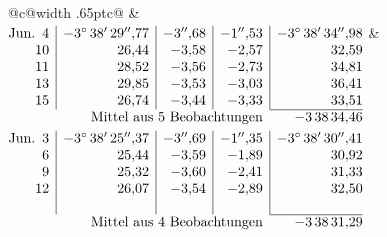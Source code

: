 \noindent\begin{tabular}{@{}c@{\hspace{.4em}\vrule width .65pt\hspace{.4em}}c@{}}
 &
 \\[.18ex]
\(\begin{array}[t]{@{}r|r|r|r|r@{}}
\text{Jun.}\enspace 4 & -3^\circ\,38'\,29''{,}77 & -3''{,}68 & -1''{,}53 & -3^\circ\,38'\,34''{,}98\\
10 & 26{,}44 & -3{,}58 & -2{,}57 & 32{,}59\\
11 & 28{,}52 & -3{,}56 & -2{,}73 & 34{,}81\\
13 & 29{,}85 & -3{,}53 & -3{,}03 & 36{,}41\\
15 & 26{,}74 & -3{,}44 & -3{,}33 & 33{,}51\\
\cline{5-5}
\multicolumn{4}{r}{\text{Mittel aus 5 Beobachtungen}} & -3\,38\,34{,}46
\end{array}\)
&
\(\begin{array}[t]{@{}r|r|r|r|r@{}}
\text{Jun.}\enspace 3 & -3^\circ\,38'\,25''{,}37 & -3''{,}69 & -1''{,}35 & -3^\circ\,38'\,30''{,}41\\
6 & 25{,}44 & -3{,}59 & -1{,}89 & 30{,}92\\
9 & 25{,}32 & -3{,}60 & -2{,}41 & 31{,}33\\
12 & 26{,}07 & -3{,}54 & -2{,}89 & 32{,}50\\
 & & & & \\
\cline{5-5}
\multicolumn{4}{r}{\text{Mittel aus 4 Beobachtungen}} & -3\,38\,31{,}29
\end{array}\)
\end{tabular}\par\medskip
\bigskip
{}
